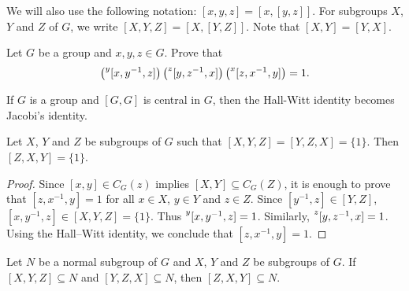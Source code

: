 We will also use the following notation:  
$[x,y,z]=[x,[y,z]]$. For subgroups $X$, $Y$ and $Z$ of $G$, we write 
$[X,Y,Z]=\left[ X,[Y,Z] \right]$. Note that $[X,Y]=[Y,X]$. 

\begin{exercise}
	\label{exercise:HallWitt}
	Let $G$ be a group and $x,y,z\in G$. Prove that 
	\begin{equation}
		\label{eq:HallWitt}
	\left(\prescript{y}{}[x,y^{-1},z]\right)\left(\prescript{z}{}[y,z^{-1},x]\right)\left(\prescript{x}{}[z,x^{-1},y]\right)=1.
	\end{equation}
\end{exercise}

If $G$ is a group and $[G,G]$ is central in $G$,
then the Hall-Witt identity becomes Jacobi's identity.

\begin{lemma}
	\label{lemma:3subgrupos}
	Let $X$, $Y$ and $Z$ be subgroups of $G$ 
 such that $[X,Y,Z]=[Y,Z,X]=\{1\}$.
	Then $[Z,X,Y]=\{1\}$.
\end{lemma}

\begin{proof}
Since $[x,y]\in C_G(z)$ implies $[X,Y]\subseteq C_G(Z)$, 
it is enough to prove that $[z,x^{-1},y]=1$ for all $x\in X$, $y\in Y$ and $z\in Z$. Since $[y^{-1},z]\in [Y,Z]$, $[x,y^{-1},z]\in [X,Y,Z]=\{1\}$. Thus $\prescript{y}{}[x,y^{-1},z]=1$. Similarly, $\prescript{z}{}[y,z^{-1},x]=1$. Using the Hall--Witt identity, we conclude that $[z,x^{-1},y]=1$.
\end{proof}

\begin{exercise}
\label{xca:3subgroups}
Let $N$ be a normal subgroup of $G$ and 
$X$, $Y$ and $Z$ be subgroups of $G$. If $[X,Y,Z]\subseteq N$ and $[Y,Z,X]\subseteq N$, then 
$[Z,X,Y]\subseteq N$.
\end{exercise}

